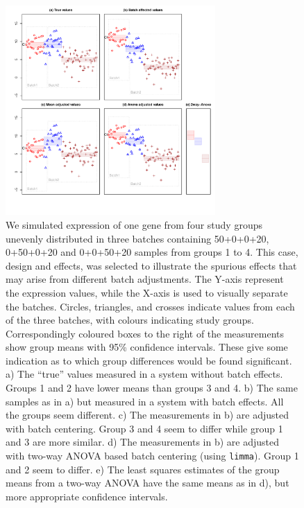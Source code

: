 \documentclass{bio}
\begin{document}
\begin{figure}[!p]
\centering\includegraphics[width=8cm]{Fig/boxplots.pdf}
\caption{We simulated expression of one gene from four study groups unevenly distributed in three batches containing 50+0+0+20, 0+50+0+20 and 0+0+50+20 samples from groups 1 to 4. This case, design and effects, was selected to illustrate the spurious effects that may arise from different batch adjustments. The Y-axis represent the expression values, while the X-axis is used to visually separate the batches. Circles, triangles, and crosses indicate values from each of the three batches, with colours indicating study groups. Correspondingly coloured boxes to the right of the measurements show group means with 95\% confidence intervals. These give some indication as to which group differences would be found significant.
a) The ``true'' values measured in a system without batch effects. Groups 1 and 2 have lower means than groups 3 and 4.
b) The same samples as in a) but measured in a system with batch effects. All the groups seem different.
c) The measurements in b) are adjusted with batch centering. Group 3 and 4 seem to differ while group 1 and 3 are more similar.
d) The measurements in b) are adjusted with two-way ANOVA based batch centering (using \texttt{limma}). Group 1 and 2 seem to differ.
e) The least squares estimates of the group means from a two-way ANOVA have the same means as in d), but more appropriate confidence intervals.
}
\label{fig:boxplots}
\end{figure}
\end{document}
